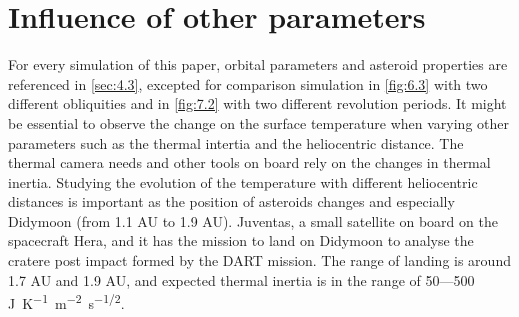 \section{Influence of other parameters}
\label{sec:8}

For every simulation of this paper, orbital parameters and asteroid properties are referenced in \autoref{sec:4.3}, excepted for comparison simulation in \autoref{fig:6.3} with two different obliquities and in \autoref{fig:7.2} with two different revolution periods. It might be essential to observe the change on the surface temperature when varying other parameters such as the thermal intertia and the heliocentric distance. The thermal camera needs and other tools on board rely on the changes in thermal inertia. Studying the evolution of the temperature with different heliocentric distances is important as the position of asteroids changes and especially Didymoon (from 1.1 AU to 1.9 AU). Juventas, a small satellite on board on the spacecraft Hera, and it has the mission to land on Didymoon to analyse the cratere post impact formed by the DART mission. The range of landing is around 1.7 AU and 1.9 AU, and expected thermal inertia is in the range of 50---500 \si{J.K^{-1}.m^{-2}.s^{-1/2}}.

